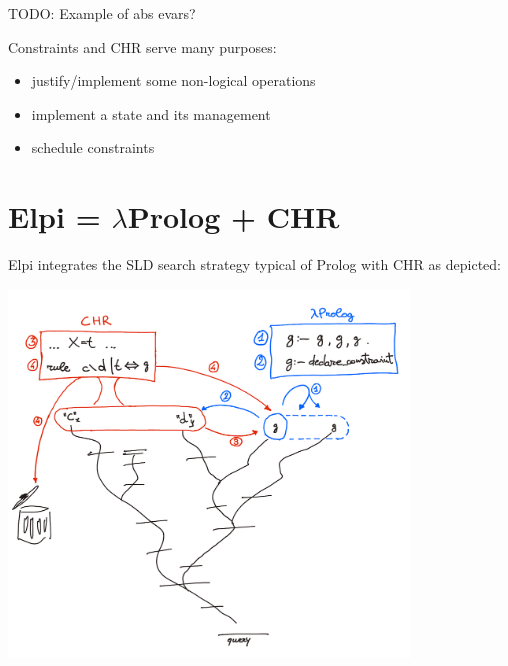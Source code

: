 \documentclass[a4paper, 11pt]{book}
\begin{document}




TODO: Example of abs evars?




Constraints and CHR serve many purposes:
\begin{itemize}
  \item justify/implement some non-logical operations
  \item implement a state and its management
  \item schedule constraints
\end{itemize}

\section{Elpi = $\lambda$Prolog + CHR}\label{sec:elpiLP+CHR}

Elpi integrates the SLD search strategy typical of Prolog with
CHR as depicted:

  \includegraphics[width=0.8\textwidth]{chr.png}
\end{document}
